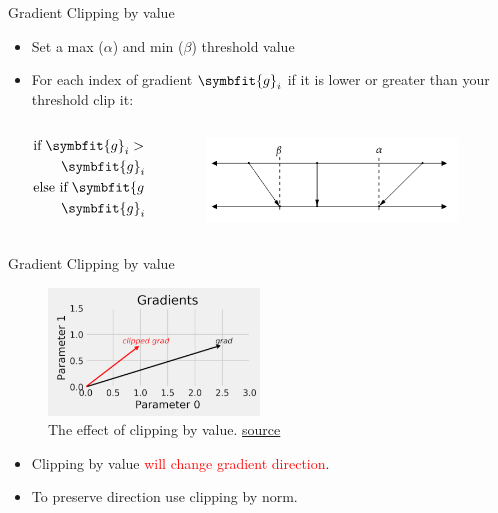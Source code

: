 \begin{frame}{Gradient Clipping by value}
	\begin{itemize}
		\item Set a max ($\alpha$) and min ($\beta$) threshold value
		\item For each index of gradient $\symbfit{g}_i$ if it is lower or greater than your threshold clip it:
		\begin{columns}
			\centering
			\begin{column}{0.45\textwidth}
				\centering
				\[
				\begin{aligned}
					&\text{if} \; \symbfit{g}_i > \alpha: \\
					&\qquad \symbfit{g}_i \gets \alpha \\
					&\text{else if} \; \symbfit{g}_i < \beta: \\
					&\qquad \symbfit{g}_i \gets \beta
				\end{aligned}
				\]
			\end{column}
			\begin{column}{0.45\textwidth}
				\centering
				\begin{figure}[H]
					\centering
					\includegraphics[width=0.95\textwidth]{Images/clipping-value.png}
				\end{figure}
			\end{column}
		\end{columns}
	\end{itemize}
\end{frame}

\begin{frame}{Gradient Clipping by value}
	\begin{figure}[H]
		\centering
		\includegraphics[width=0.5\textwidth]{Images/clip-by-value.png}
		\caption{The effect of clipping by value. \href{https://github.com/dvgodoy/PyTorchStepByStep/blob/master/ChapterExtra.ipynb}{source}}
	\end{figure}
	\begin{itemize}
		\item Clipping by value \textcolor{red}{will change gradient direction}.
		\item To preserve direction use clipping by norm.
	\end{itemize}
\end{frame}

